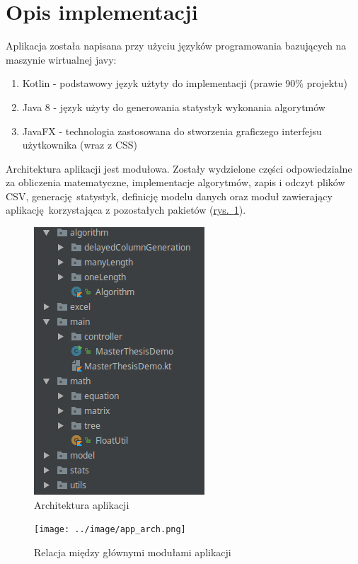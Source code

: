 \section{Opis implementacji}
Aplikacja została napisana przy użyciu języków programowania bazujących na maszynie wirtualnej javy:
\begin{enumerate}
  \item Kotlin - podstawowy język użtyty do implementacji (prawie 90\% projektu)
  \item Java 8 - język użyty do generowania statystyk wykonania algorytmów
  \item JavaFX - technologia zastosowana do stworzenia graficzego interfejsu użytkownika (wraz z CSS)
\end{enumerate}

Architektura aplikacji jest modułowa. Zostały wydzielone części odpowiedzialne za obliczenia matematyczne, implementacje algorytmów, zapis i odczyt plików CSV, generację statystyk, definicję modelu danych oraz moduł zawierający aplikację korzystająca z pozostałych pakietów (\hyperref[fig:arch]{rys.~\ref*{fig:arch}}).

\begin{figure}[h]
  \center
  \includegraphics[scale=0.65]{../image/arch.png}
  \caption{Architektura aplikacji}
  \label{fig:arch}
\end{figure}

\begin{figure}[h]
  \center
  \texttt{[image: ../image/app\_arch.png]}
  \caption{Relacja między głównymi modułami aplikacji}
  \label{fig:app_arch}
\end{figure}

